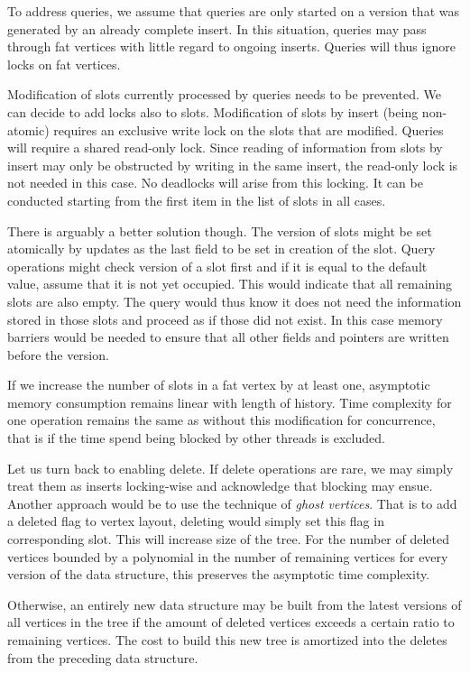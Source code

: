 To address queries, we assume that queries are only started on a version that was generated by an already complete insert. In this situation, queries may pass through fat vertices with little regard to ongoing inserts. Queries will thus ignore locks on fat vertices. 

Modification of slots currently processed by queries needs to be prevented. We can decide to add locks also to slots. Modification of slots by insert (being non-atomic) requires an exclusive write lock on the slots that are modified. Queries will require a shared read-only lock. Since reading of information from slots by insert may only be obstructed by writing in the same insert, the read-only lock is not needed in this case. No deadlocks will arise from this locking. It can be conducted starting from the first item in the list of slots in all cases. 

There is arguably a better solution though. The version of slots might be set atomically by updates as the last field to be set in creation of the slot. Query operations might check version of a slot first and if it is equal to the default value, assume that it is not yet occupied. This would indicate that all remaining slots are also empty. The query would thus know it does not need the information stored in those slots and proceed as if those did not exist. 
In this case memory barriers would be needed to ensure that all other fields and pointers are written before the version.

If we increase the number of slots in a fat vertex by at least one, asymptotic memory consumption remains linear with length of history. Time complexity for one operation remains the same as without this modification for concurrence, that is if the time spend being blocked by other threads is excluded.

Let us turn back to enabling delete. If delete operations are rare, we may simply treat them as inserts locking-wise and acknowledge that blocking may ensue. Another approach would be to use the technique of \textit{ghost vertices}. That is to add a deleted flag to vertex layout, deleting would simply set this flag in corresponding slot. This will increase size of the tree. For the number of deleted vertices bounded by a polynomial in the number of remaining vertices for every version of the data structure, this preserves the asymptotic time complexity. 

Otherwise, an entirely new data structure may be built from the latest versions of all vertices in the tree if the amount of deleted vertices exceeds a certain ratio to remaining vertices. The cost to build this new tree is amortized into the deletes from the preceding data structure.

